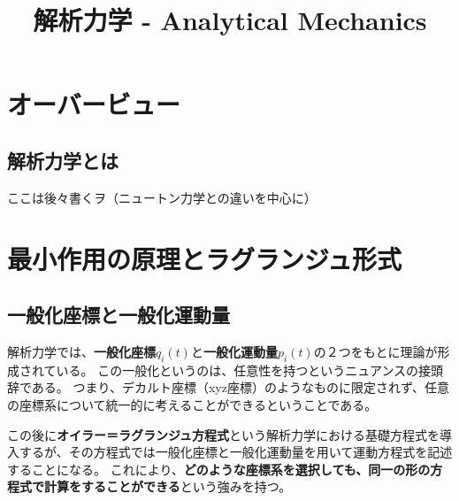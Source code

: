\documentclass[a4paper]{jsreport}
\title{解析力学 - Analytical Mechanics}
\begin{document}
    \maketitle

    \tableofcontents

    \chapter{オーバービュー}
        \section{解析力学とは}
            ここは後々書くヲ（ニュートン力学との違いを中心に）

    \chapter{最小作用の原理とラグランジュ形式}
        \section{一般化座標と一般化運動量}
            解析力学では、\textbf{一般化座標$q_i(t)$}と\textbf{一般化運動量$p_i(t)$}の２つをもとに理論が形成されている。
            この一般化というのは、任意性を持つというニュアンスの接頭辞である。
            つまり、デカルト座標（xyz座標）のようなものに限定されず、任意の座標系について統一的に考えることができるということである。\par
            この後に\textbf{オイラー＝ラグランジュ方程式}という解析力学における基礎方程式を導入するが、その方程式では一般化座標と一般化運動量を用いて運動方程式を記述することになる。
            これにより、\textbf{どのような座標系を選択しても、同一の形の方程式で計算をすることができる}という強みを持つ。
\end{document}
